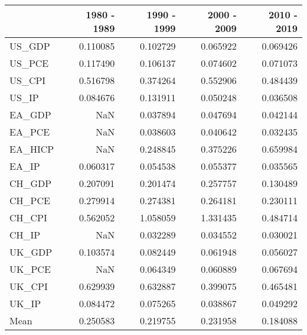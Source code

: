\begin{tabular}{lrrrr}
\toprule
{} &  1980 - 1989 &  1990 - 1999 &  2000 - 2009 &  2010 - 2019 \\
\midrule
US\_GDP  &     0.110085 &     0.102729 &     0.065922 &     0.069426 \\
US\_PCE  &     0.117490 &     0.106137 &     0.074602 &     0.071073 \\
US\_CPI  &     0.516798 &     0.374264 &     0.552906 &     0.484439 \\
US\_IP   &     0.084676 &     0.131911 &     0.050248 &     0.036508 \\
EA\_GDP  &          NaN &     0.037894 &     0.047694 &     0.042144 \\
EA\_PCE  &          NaN &     0.038603 &     0.040642 &     0.032435 \\
EA\_HICP &          NaN &     0.248845 &     0.375226 &     0.659984 \\
EA\_IP   &     0.060317 &     0.054538 &     0.055377 &     0.035565 \\
CH\_GDP  &     0.207091 &     0.201474 &     0.257757 &     0.130489 \\
CH\_PCE  &     0.279914 &     0.274381 &     0.264181 &     0.230111 \\
CH\_CPI  &     0.562052 &     1.058059 &     1.331435 &     0.484714 \\
CH\_IP   &          NaN &     0.032289 &     0.034552 &     0.030021 \\
UK\_GDP  &     0.103574 &     0.082449 &     0.061948 &     0.056027 \\
UK\_PCE  &          NaN &     0.064349 &     0.060889 &     0.067694 \\
UK\_CPI  &     0.629939 &     0.632887 &     0.399075 &     0.465481 \\
UK\_IP   &     0.084472 &     0.075265 &     0.038867 &     0.049292 \\
Mean    &     0.250583 &     0.219755 &     0.231958 &     0.184088 \\
\bottomrule
\end{tabular}
